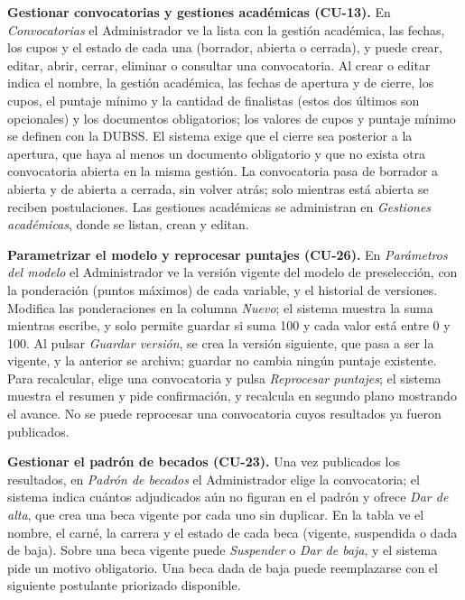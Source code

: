\textbf{Gestionar convocatorias y gestiones académicas (CU-13).} En \textit{Convocatorias} el Administrador ve la lista con la gestión académica, las fechas, los cupos y el estado de cada una (borrador, abierta o cerrada), y puede crear, editar, abrir, cerrar, eliminar o consultar una convocatoria. Al crear o editar indica el nombre, la gestión académica, las fechas de apertura y de cierre, los cupos, el puntaje mínimo y la cantidad de finalistas (estos dos últimos son opcionales) y los documentos obligatorios; los valores de cupos y puntaje mínimo se definen con la DUBSS. El sistema exige que el cierre sea posterior a la apertura, que haya al menos un documento obligatorio y que no exista otra convocatoria abierta en la misma gestión. La convocatoria pasa de borrador a abierta y de abierta a cerrada, sin volver atrás; solo mientras está abierta se reciben postulaciones. Las gestiones académicas se administran en \textit{Gestiones académicas}, donde se listan, crean y editan.\par

\textbf{Parametrizar el modelo y reprocesar puntajes (CU-26).} En \textit{Parámetros del modelo} el Administrador ve la versión vigente del modelo de preselección, con la ponderación (puntos máximos) de cada variable, y el historial de versiones. Modifica las ponderaciones en la columna \textit{Nuevo}; el sistema muestra la suma mientras escribe, y solo permite guardar si suma 100 y cada valor está entre 0 y 100. Al pulsar \textit{Guardar versión}, se crea la versión siguiente, que pasa a ser la vigente, y la anterior se archiva; guardar no cambia ningún puntaje existente. Para recalcular, elige una convocatoria y pulsa \textit{Reprocesar puntajes}; el sistema muestra el resumen y pide confirmación, y recalcula en segundo plano mostrando el avance. No se puede reprocesar una convocatoria cuyos resultados ya fueron publicados.\par

\textbf{Gestionar el padrón de becados (CU-23).} Una vez publicados los resultados, en \textit{Padrón de becados} el Administrador elige la convocatoria; el sistema indica cuántos adjudicados aún no figuran en el padrón y ofrece \textit{Dar de alta}, que crea una beca vigente por cada uno sin duplicar. En la tabla ve el nombre, el carné, la carrera y el estado de cada beca (vigente, suspendida o dada de baja). Sobre una beca vigente puede \textit{Suspender} o \textit{Dar de baja}, y el sistema pide un motivo obligatorio. Una beca dada de baja puede reemplazarse con el siguiente postulante priorizado disponible.\par

